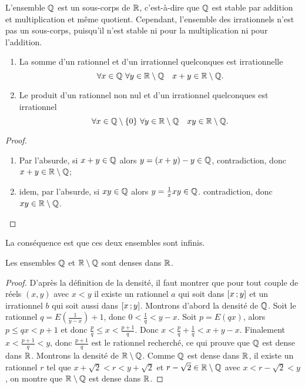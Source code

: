 L'ensemble \(\mathbb{Q}\) est un sous-corps de \(\mathbb{R}\), c'est-à-dire que \(\mathbb{Q}\) est 
stable par addition et multiplication et même quotient. Cependant, l'ensemble 
des irrationnels n'est pas un sous-corps, puisqu'il n'est stable ni pour la 
multiplication ni pour l'addition.

\begin{prop}
  \begin{enumerate}
    \item La somme d'un rationnel et d'un irrationnel quelconques est 
      irrationnelle
      \begin{equation}
        \forall x \in \mathbb{Q} \ \forall y \in \mathbb{R}\setminus\mathbb{Q} \quad x+y \in 
        \mathbb{R}\setminus\mathbb{Q}.
      \end{equation}
    \item Le produit d'un rationnel non nul et d'un irrationnel quelconques est 
      irrationnel
      \begin{equation}
        \forall x \in \mathbb{Q}\setminus\{0\} \ \forall y \in \mathbb{R}\setminus\mathbb{Q} \quad xy 
        \in \mathbb{R}\setminus\mathbb{Q}.
      \end{equation}
  \end{enumerate}
\end{prop}
\begin{proof}
  \begin{enumerate}
    \item Par l'absurde, si \(x+y\in\mathbb{Q}\) alors \(y=(x+y)-y \in \mathbb{Q}\), 
      contradiction, donc \(x+y\in\mathbb{R}\setminus\mathbb{Q}\);
    \item idem, par l'absurde, si \(xy\in \mathbb{Q}\) alors \(y=\frac{1}{x}xy\in\mathbb{Q}\). 
      contradiction, donc \(xy\in\mathbb{R}\setminus\mathbb{Q}\).
  \end{enumerate}
\end{proof}

La conséquence est que ces deux ensembles sont infinis.

\begin{theo}
  Les ensembles \(\mathbb{Q}\) et \(\mathbb{R}\setminus\mathbb{Q}\) sont denses dans \(\mathbb{R}\).
\end{theo}
\begin{proof}
  D'après la définition de la densité, il faut montrer que pour tout couple de 
  réels \((x,y)\) avec \(x<y\) il existe un rationnel \(a\) qui soit dans 
  \(\left[ x \, ;  y \right]\) et un irrationnel \(b\) qui soit aussi dans 
  \(\left[ x \, ;  y \right]\). Montrons d'abord la densité de \(\mathbb{Q}\). Soit le 
  rationnel \(q=E\left(\frac{1}{y-x}\right)+1\), donc \(0<\frac{1}{q}<y-x\). 
  Soit \(p=E(qx)\), alors \(p\leqslant qx<p+1\) et donc \(\frac{p}{q}\leqslant x 
  <\frac{p+1}{q}\). Donc \(x<\frac{p}{q}+\frac{1}{q}<x+y-x\). Finalement 
  \(x<\frac{p+1}{q}<y\), donc \(\frac{p+1}{q}\) est le rationnel recherché, ce 
  qui prouve que \(\mathbb{Q}\) est dense dans \(\mathbb{R}\). Montrons la densité de 
  \(\mathbb{R}\setminus\mathbb{Q}\). Comme \(\mathbb{Q}\) est dense dans \(\mathbb{R}\), il existe un rationnel 
  \(r\) tel que \(x+\sqrt{2}<r<y+\sqrt{2}\) et \(r-\sqrt{2}\in\mathbb{R}\setminus\mathbb{Q}\) 
  avec \(x<r-\sqrt{2}<y\), on montre que  \(\mathbb{R}\setminus\mathbb{Q}\) est dense dans 
  \(\mathbb{R}\).
\end{proof}

